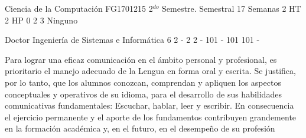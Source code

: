 \documentclass[a4paper,8pt]{article}
\begin{document}
\setNombreProfesor{}
\setGradoProfesorAbreviado{}
\sylabusHeader

\academicaTable
{Ciencia de la Computación} %
{FG1701215} %
{2$^{do}$ Semestre.} %
{Semestral} %
{17 Semanas} %
{2 HT} %
{2 HP} %
{0} %
{}  %
{2} %
{3} %
{Ninguno} %

\administrativaTable
{Doctor} %
{Ingeniería de Sistemas e Informática} %
{6} %
{2} %
{-} %
{2} %
{2} %
{-} %
{101} %
{-} %
{101} %
{101} %
{-} %


\begin{fundamentacion}
Para lograr una eficaz comunicación en el ámbito personal y profesional, es prioritario el manejo adecuado de la Lengua en forma oral y escrita. Se justifica, por lo tanto, que los alumnos  conozcan, comprendan y apliquen los aspectos conceptuales y operativos de su idioma, para el desarrollo de sus habilidades comunicativas fundamentales: Escuchar, hablar, leer y escribir.
En consecuencia el ejercicio permanente y el aporte de los fundamentos contribuyen grandemente en la formación académica y, en el futuro, en el desempeño de su profesión

\end{fundamentacion}
\end{document}

